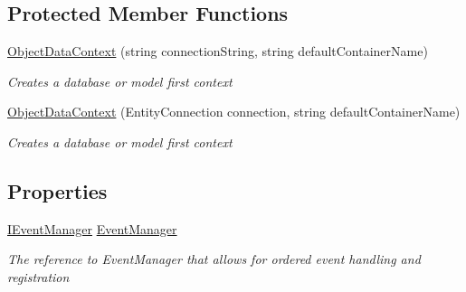\subsection*{Protected Member Functions}
\begin{DoxyCompactItemize}
\item 
\hyperlink{class_highway_1_1_data_1_1_object_data_context_ab0a277266fa968f8552423f44ae96a98}{Object\-Data\-Context} (string connection\-String, string default\-Container\-Name)
\begin{DoxyCompactList}\small\item\em Creates a database or model first context \end{DoxyCompactList}\item 
\hyperlink{class_highway_1_1_data_1_1_object_data_context_ae972bcd3b566e636d95c6e31a46b551d}{Object\-Data\-Context} (Entity\-Connection connection, string default\-Container\-Name)
\begin{DoxyCompactList}\small\item\em Creates a database or model first context \end{DoxyCompactList}\end{DoxyCompactItemize}
\subsection*{Properties}
\begin{DoxyCompactItemize}
\item 
\hyperlink{interface_highway_1_1_data_1_1_interfaces_1_1_i_event_manager}{I\-Event\-Manager} \hyperlink{class_highway_1_1_data_1_1_object_data_context_a1be407a6d9a2d147511ca72d6a09ff49}{Event\-Manager}
\begin{DoxyCompactList}\small\item\em The reference to Event\-Manager that allows for ordered event handling and registration \end{DoxyCompactList}\end{DoxyCompactItemize}
